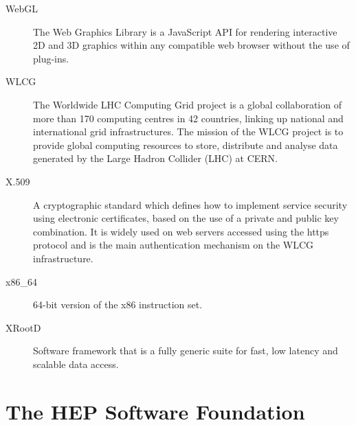 \documentclass[twocolumn]{svjour3}          %
\begin{document}
\begin{appendices}
\begin{description}
\item[WebGL] The Web Graphics Library is a JavaScript API for rendering
interactive 2D and 3D graphics within any compatible web browser without
the use of plug-ins.

\item[WLCG] The Worldwide LHC Computing Grid project is a global collaboration
of more than 170 computing centres in 42 countries, linking up national
and international grid infrastructures. The mission of the WLCG project
is to provide global computing resources to store, distribute and
analyse data generated by the Large Hadron Collider (LHC) at CERN.

\item[X.509] A cryptographic standard which defines how to implement service
security using electronic certificates, based on the use of a private
and public key combination. It is widely used on web servers accessed
using the https protocol and is the main authentication mechanism on the
WLCG infrastructure.

\item[x86\_64] 64-bit version of the x86 instruction set.

\item[XRootD] Software framework that is a fully generic suite for fast, low latency and scalable data access.

\end{description}

\end{appendices}

\sloppy
\raggedright
\clearpage
\printbibliography[title={References},heading=bibintoc]

\clearpage
\section*{The HEP Software Foundation}

\end{document}
